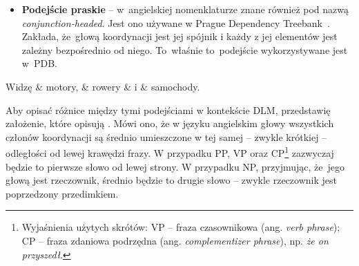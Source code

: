\documentclass[licencjacka]{pracamgr_Kogni}
\begin{document}
    \begin{itemize}
        \item\textbf{Podejście praskie} -- w~angielskiej nomenklaturze znane również pod nazwą \textit{conjunction-headed}.
        Jest ono używane w Prague Dependency Treebank~\citep{Hajic2006}.
        Zakłada, że~głową koordynacji jest jej spójnik i każdy z jej elementów jest zależny bezpośrednio od niego.
        To~właśnie to~podejście wykorzystywane jest w~PDB.
    \end{itemize}
    \begin{exe}
        \ex
        \begin{dependency}[theme = simple, group style = bubble, segmented edge, edge vertical padding=0.5ex, edge unit distance=1.2ex, baseline=3em]
            \centering
            \begin{deptext}[column sep=1cm]
                Widzę \& motory, \& rowery \& i \& samochody.\\
            \end{deptext}
        \end{dependency}
        \label{ex:conjunction-headed}
    \end{exe}

    Aby opisać różnice między tymi podejściami w kontekście DLM, przedstawię założenie, które opisują \citet{Przepiorkowski2023}.
    Mówi ono, że w języku angielskim głowy wszystkich członów koordynacji są średnio umieszczone w tej samej -- zwykle krótkiej -- odległości od lewej krawędzi frazy.
    W przypadku PP, VP oraz CP\footnote{Wyjaśnienia użytych skrótów: VP -- fraza czasownikowa (ang. \textit{verb phrase}); CP -- fraza zdaniowa podrzędna (ang. \textit{complementizer phrase}), np. \textit{że on przyszedł}.} zazwyczaj będzie to pierwsze słowo od lewej strony.
    W przypadku NP, przyjmując, że~jego głową jest rzeczownik, średnio będzie to drugie słowo -- zwykle rzeczownik jest poprzedzony przedimkiem.
\end{document}
